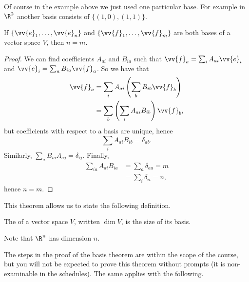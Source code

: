 Of course in the example above we just used one particular base. 
For example in $\R^2$ another basis consists of $\{(1, 0), (1, 1)\}$. 

\begin{theorem}
    If $\{\vv{e}_1, \dots, \vv{e}_n\}$ and $\{\vv{f}_1, \dots, \vv{f}_m\}$ are both bases of a vector space $V$, then $n = m$.
\end{theorem}
\begin{proof}
    We can find coefficients $A_{ai}$ and $B_{ia}$ such that $\vv{f}_a = \sum_i A_{ai} \vv{e}_i$ and $\vv{e}_i = \sum_a B_{ia} \vv{f}_a$. So we have that
    \begin{align*}
    \vv{f}_a &= \sum_i A_{ai} \left(\sum_b B_{ib} \vv{f}_b\right) \\
        &= \sum_b \left(\sum_{i} A_{ai} B_{ib}\right)\vv{f}_b,
\end{align*}
    but coefficients with respect to a basis are unique, hence
    $$
    \sum_{i} A_{ai} B_{ib} = \delta_{ab}.
    $$
    Similarly, $\sum_{a} B_{ia} A_{aj} = \delta_{ij}$. Finally,
    \begin{align*}
        \sum_{ia} A_{ai} B_{ia} &= \sum_{a} \delta_{aa} = m \\
        &= \sum_i \delta_{ii} = n,
     \end{align*}
     hence $n = m$.
\end{proof}

This theorem allows us to state the following definition.

\begin{definition}[Dimension]
    The  of a vector space $V$, written $\operatorname{dim} V$, is the size of its basis.
\end{definition}

Note that $\R^n$ has dimension $n$.

The steps in the proof of the basis theorem are within the scope of the course, but you will not be expected to prove this theorem without prompts (it is non-examinable in the schedules). The same applies with the following.


